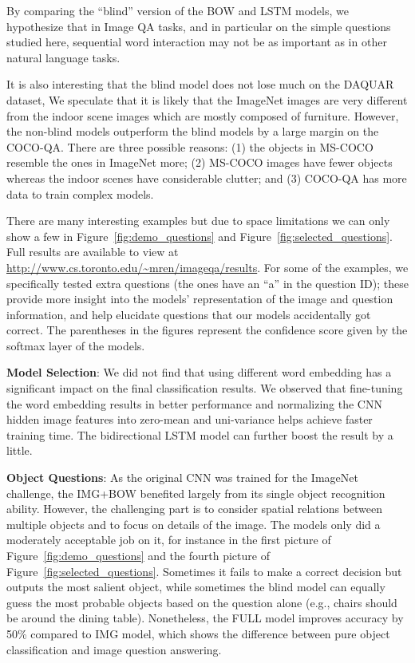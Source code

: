 \documentclass{article} %
\renewcommand{\#}[1]{\textbf{#1}}
\begin{document}
By comparing the “blind” version of the BOW and LSTM models, we hypothesize
that in Image QA tasks, and in particular on the simple questions studied here,
sequential word interaction may not be as important as in other natural
language tasks. 

It is also interesting that the blind model does not lose much on the DAQUAR
dataset, We speculate that it is likely that the ImageNet images are very
different from the indoor scene images which are mostly composed of furniture.
However, the non-blind models outperform the blind models by a large margin on
the COCO-QA. There are three possible reasons: (1) the objects in MS-COCO
resemble the ones in ImageNet more; (2) MS-COCO images have fewer objects
whereas the indoor scenes have considerable clutter; and (3) COCO-QA has more
data to train complex models.

There are many interesting examples but due to space limitations we can only
show a few in Figure~\ref{fig:demo_questions} and
Figure~\ref{fig:selected_questions}. Full results are available to view at
\url{http://www.cs.toronto.edu/~mren/imageqa/results}.  For some of the
examples, we specifically tested extra questions (the ones have an ``a'' in the
question ID); these provide more insight into the models' representation of the
image and question information, and help elucidate questions that our models
accidentally got correct. The parentheses in the figures represent the
confidence score given by the softmax layer of the models.

\textbf{Model Selection}: We did not find that using different word embedding
has a significant impact on the final classification results. We observed that
fine-tuning the word embedding results in better performance and normalizing
the CNN hidden image features into zero-mean and uni-variance helps achieve
faster training time. The bidirectional LSTM model can further boost the result
by a little.
 
\textbf{Object Questions}: As the original CNN was trained for the ImageNet
challenge, the IMG+BOW benefited largely from its single object recognition
ability. However, the challenging part is to consider spatial relations between
multiple objects and to focus on details of the image. The models only did a
moderately acceptable job on it, for instance in the first picture of
Figure~\ref{fig:demo_questions} and the fourth picture of
Figure~\ref{fig:selected_questions}. Sometimes it fails to make a correct
decision but outputs the most salient object, while sometimes the blind model
can equally guess the most probable objects based on the question alone (e.g.,
chairs should be around the dining table). Nonetheless, the FULL model improves
accuracy by 50\% compared to IMG model, which shows the difference between pure
object classification and image question answering.
\end{document}

